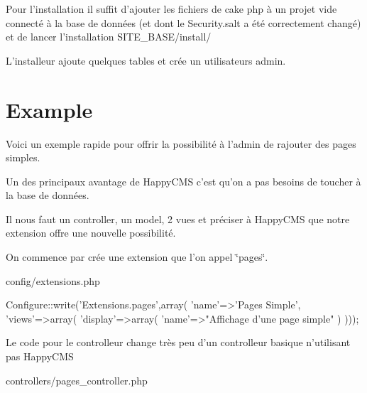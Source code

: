 \-Pour l'installation il suffit d'ajouter les fichiers de cake php à un projet vide connecté à la base de données (et dont le \-Security.\-salt a été correctement changé) et de lancer l'installation \-S\-I\-T\-E\-\_\-\-B\-A\-S\-E/install/ \par
\par
 \-L'installeur ajoute quelques tables et crée un utilisateurs admin.\hypertarget{index_example_sec}{}\section{\-Example}\label{index_example_sec}
\-Voici un exemple rapide pour offrir la possibilité à l'admin de rajouter des pages simples. \par
\-Un des principaux avantage de \-Happy\-C\-M\-S c'est qu'on a pas besoins de toucher à la base de données. \par
 \par
 \-Il nous faut un controller, un model, 2 vues et préciser à \-Happy\-C\-M\-S que notre extension offre une nouvelle possibilité. \par
\par
 \-On commence par crée une extension que l'on appel \char`\"{}pages\char`\"{}.\par
 config/extensions.\-php 
\begin{DoxyCode}
 Configure::write('Extensions.pages',array(
                                           'name'=>'Pages Simple',
                                           'views'=>array(
                                              'display'=>array(
                                                  'name'=>"Affichage d'une page
       simple"
                                                  )
                                          )));
\end{DoxyCode}
 \par
 \-Le code pour le controlleur change très peu d'un controlleur basique n'utilisant pas \-Happy\-C\-M\-S \par
\par
controllers/pages\-\_\-controller.\-php 
